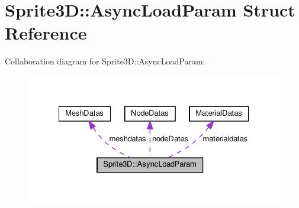 \hypertarget{structSprite3D_1_1AsyncLoadParam}{}\section{Sprite3D\+:\+:Async\+Load\+Param Struct Reference}
\label{structSprite3D_1_1AsyncLoadParam}


Collaboration diagram for Sprite3D\+:\+:Async\+Load\+Param\+:
\nopagebreak
\begin{figure}[H]
\begin{center}
\leavevmode
\includegraphics[width=327pt]{structSprite3D_1_1AsyncLoadParam__coll__graph}
\end{center}
\end{figure}
